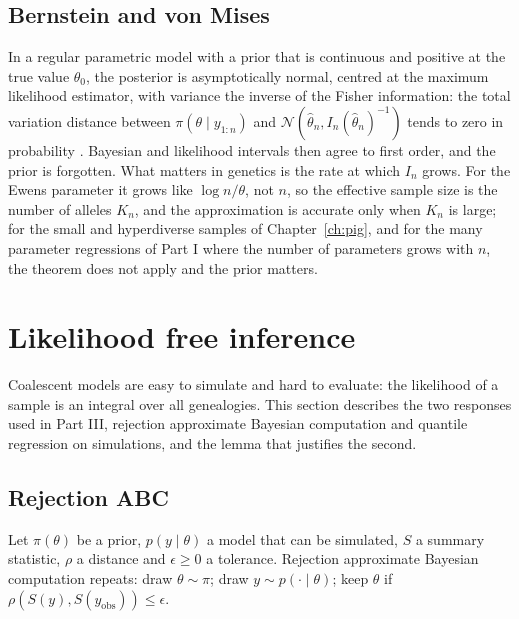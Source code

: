 \subsection{Bernstein and von Mises}\label{toolkit:sec:bvm}

In a regular parametric model with a prior that is continuous and positive at the true value
$\theta_0$, the posterior is asymptotically normal, centred at the maximum likelihood estimator,
with variance the inverse of the Fisher information: the total variation distance between
$\pi(\theta\mid y_{1:n})$ and $\mathcal{N}(\hat\theta_n,I_n(\hat\theta_n)^{-1})$ tends to zero in
probability \citep{toolkit:vandervaart1998}. Bayesian and likelihood intervals then agree to first
order, and the prior is forgotten. What matters in genetics is the rate at which $I_n$ grows. For
the Ewens parameter it grows like $\log n/\theta$, not $n$, so the effective sample size is the
number of alleles $K_n$, and the approximation is accurate only when $K_n$ is large; for the
small and hyperdiverse samples of Chapter~\ref{ch:pig}, and for the many parameter regressions of
Part I where the number of parameters grows with $n$, the theorem does not apply and the prior
matters.

\section{Likelihood free inference}\label{toolkit:sec:lfi}

Coalescent models are easy to simulate and hard to evaluate: the likelihood of a sample is an
integral over all genealogies. This section describes the two responses used in Part III,
rejection approximate Bayesian computation and quantile regression on simulations, and the lemma
that justifies the second.

\subsection{Rejection ABC}\label{toolkit:sec:abc}

Let $\pi(\theta)$ be a prior, $p(y\mid\theta)$ a model that can be simulated, $S$ a summary
statistic, $\rho$ a distance and $\epsilon\ge0$ a tolerance. Rejection approximate Bayesian
computation \citep{toolkit:tavare1997,toolkit:pritchard1999,toolkit:beaumont2002} repeats:
draw $\theta\sim\pi$; draw $y\sim p(\cdot\mid\theta)$; keep $\theta$ if
$\rho(S(y),S(y_{\mathrm{obs}}))\le\epsilon$.

